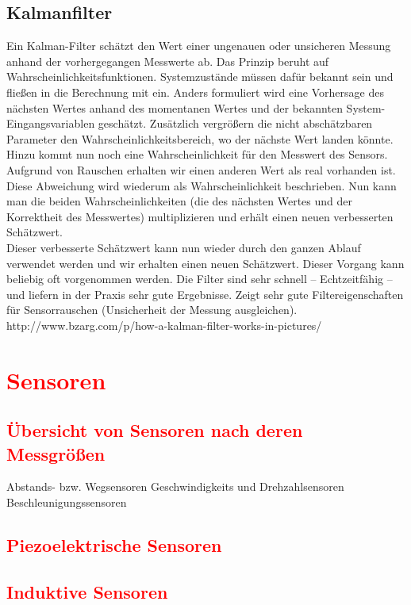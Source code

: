 		\subsection{Kalmanfilter}
			Ein Kalman-Filter schätzt den Wert einer ungenauen oder unsicheren Messung anhand der vorhergegangen Messwerte ab. Das Prinzip beruht auf Wahrscheinlichkeitsfunktionen. Systemzustände müssen dafür bekannt sein und fließen in die Berechnung mit ein. Anders formuliert wird eine Vorhersage des nächsten Wertes anhand des momentanen Wertes und der bekannten System-Eingangsvariablen geschätzt. Zusätzlich vergrößern die nicht abschätzbaren Parameter den Wahrscheinlichkeitsbereich, wo der nächste Wert landen könnte. Hinzu kommt nun noch eine Wahrscheinlichkeit für den Messwert des Sensors. Aufgrund von Rauschen erhalten wir einen anderen Wert als real vorhanden ist. Diese Abweichung wird wiederum als Wahrscheinlichkeit beschrieben. Nun kann man die beiden Wahrscheinlichkeiten (die des nächsten Wertes und der Korrektheit des Messwertes) multiplizieren und erhält einen neuen verbesserten Schätzwert.\\
			Dieser verbesserte Schätzwert kann nun wieder durch den ganzen Ablauf verwendet werden und wir erhalten einen neuen Schätzwert. Dieser Vorgang kann beliebig oft vorgenommen werden.
			Die Filter sind sehr schnell – Echtzeitfähig – und liefern in der Praxis sehr gute Ergebnisse. Zeigt sehr gute Filtereigenschaften für Sensorrauschen (Unsicherheit der Messung ausgleichen).\\
			http://www.bzarg.com/p/how-a-kalman-filter-works-in-pictures/
			
	\section{\textcolor{red}{Sensoren}}
		\subsection{\textcolor{red}{Übersicht von Sensoren nach deren Messgrößen}}
		Abstands- bzw. Wegsensoren
		Geschwindigkeits und Drehzahlsensoren
		Beschleunigungssensoren
		\subsection{\textcolor{red}{Piezoelektrische Sensoren}}
		\subsection{\textcolor{red}{Induktive Sensoren}}
